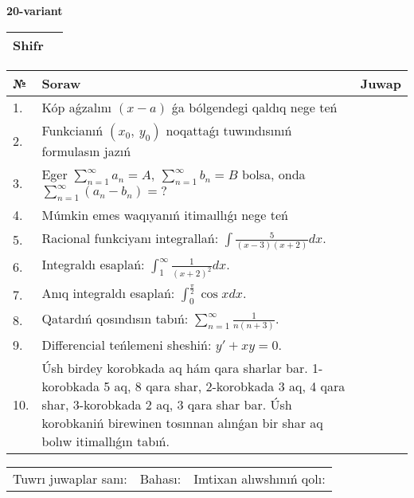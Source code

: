 \documentclass{article}
\begin{document}
  \egroup
  
  \newpage
  
  
  \textbf{20-variant}\\
  
  \bgroup
  \def\arraystretch{1.6} %
  
  \begin{tabular}{|m{5.7cm}|m{9.5cm}|}
  \hline
  Shifr & \\
  \hline
  \end{tabular}
  
  \vspace{1cm}
  
  \begin{tabular}{|m{0.7cm}|m{10cm}|m{4cm}|}
  \hline
  № & Soraw & Juwap \\
  \hline
  1. & Kóp aǵzalını \((x - a)\) ǵa bólgendegi qaldıq nege teń &  \\
  \hline
  2. & Funkcianıń \((x_{0},\ y_{0})\) noqattaǵı tuwındısınıń formulasın jazıń &  \\
  \hline
  3. & Eger \(\sum_{n = 1}^{\infty}a_{n} = A,\ \sum_{n = 1}^{\infty}b_{n} = B\) bolsa, onda \(\sum_{n = 1}^{\infty}\left( a_{n} - b_{n} \right) = ?\) &  \\
  \hline
  4. & Múmkin emes waqıyanıń itimaıllıǵı nege teń &  \\
  \hline
  5. & Racional funkciyanı integrallań: \(\int{\frac{5}{(x - 3)(x + 2)}dx}\). &  \\
  \hline
  6. & Integraldı esaplań: \(\int_{1}^{\infty}{\frac{1}{(x + 2)^2 }dx}\). &  \\
  \hline
  7. & Anıq integraldı esaplań: \(\int_{0}^{\frac{\pi}{2}}{\cos xdx}\). &  \\
  \hline
  8. & Qatardıń qosındısın tabıń: \(\sum_{n = 1}^{\infty}\frac{1}{n(n + 3)}\). &  \\
  \hline
  9. & Differencial teńlemeni sheshiń: \(y' + xy = 0\). &  \\
  \hline
  10. & Úsh birdey korobkada aq hám qara sharlar bar. 1-korobkada 5 aq, 8 qara shar, 2-korobkada 3 aq, 4 qara shar, 3-korobkada 2 aq, 3 qara shar bar. Úsh korobkaniń birewinen tosınnan alınǵan bir shar aq bolıw itimallıǵın tabıń. &  \\
  \hline
  \end{tabular}
  
  \vspace{1cm}
  
  \begin{tabular}{lll}
  Tuwrı juwaplar sanı: \underline{\hspace{1.5cm}} & 
  Bahası: \underline{\hspace{1.5cm}} & 
  Imtixan alıwshınıń qolı: \underline{\hspace{2cm}} \\
  \end{tabular}
  
\end{document}
